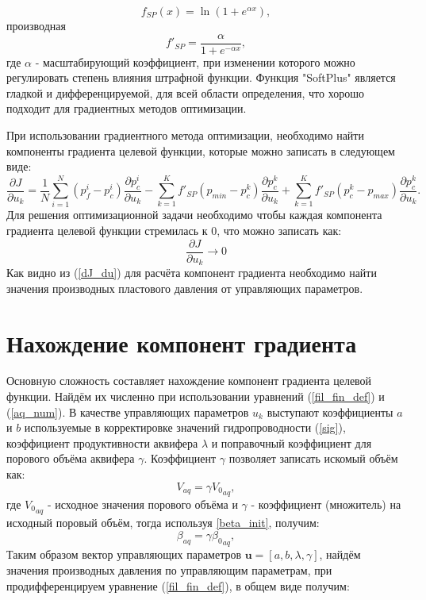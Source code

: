\documentclass[14pt]{article}
\begin{document}
\begin{equation} \label{SP}
f_{SP}(x) = \ln\left(1+e^{\alpha x}\right),
\end{equation}
производная 
\begin{equation} \label{dSP}
f'_{SP} = \frac{\alpha}{1+e^{-\alpha x}},
\end{equation}
где $ \alpha $ - масштабирующий коэффициент, при изменении которого можно регулировать степень влияния штрафной функции. Функция "SoftPlus" является гладкой и дифференцируемой, для всей области определения, что хорошо подходит для градиентных методов оптимизации. 

При использовании градиентного метода оптимизации, необходимо найти компоненты градиента целевой функции, которые можно записать в следующем виде:
\begin{equation}\label{dJ_du}
	\frac{\partial J}{\partial u_k} = \frac{1}{N}\sum_{i=1}^N \left(p_f^i-p_c^i\right)\frac{\partial p_c^i}{\partial u_k} - \sum_{k=1}^K{f'_{SP}(p_{min} - p^k_c)\frac{\partial p_c^k}{\partial u_k}} + \sum_{k=1}^K{f'_{SP}(p^k_c-p_{max})\frac{\partial p_c^k}{\partial u_k}}.
\end{equation}
Для решения оптимизационной задачи необходимо чтобы каждая компонента градиента целевой функции стремилась к 0, что можно записать как:
\begin{equation} \label{dJ_du0}
\frac{\partial J}{\partial u_k} \rightarrow 0
\end{equation}
Как видно из (\ref{dJ_du}) для расчёта компонент градиента необходимо найти значения производных пластового давления от управляющих параметров.

\section{Нахождение компонент градиента}
Основную сложность составляет нахождение компонент градиента целевой функции. Найдём их численно при использовании уравнений (\ref{fil_fin_def}) и (\ref{aq_num}). В качестве управляющих параметров $ u_k $ выступают коэффициенты $ a $ и $ b $ используемые в корректировке значений гидропроводности   (\ref{sig}), коэффициент продуктивности аквифера $ \lambda $ и поправочный коэффициент для порового объёма аквифера $ \gamma $. Коэффициент $ \gamma $ позволяет записать искомый объём как:
\begin{equation*} \label{gamma_init}
V_{aq} = \gamma{V_0}_{aq},
\end{equation*}
 где $ {V_0}_{aq}$ -  исходное значения порового объёма и $ \gamma $ - коэффициент (множитель) на исходный поровый объём, тогда используя {\ref{beta_init}}, получим:
 \begin{equation} \label{beta_gamma}
 \beta_{aq} = \gamma {\beta_0}_{aq},
 \end{equation}
  Таким образом вектор управляющих параметров $ \boldsymbol{u} = [a,b,\lambda,\gamma]$, найдём значения производных давления по управляющим параметрам, при продифференцируем уравнение (\ref{fil_fin_def}), в общем виде получим:
\end{document}
